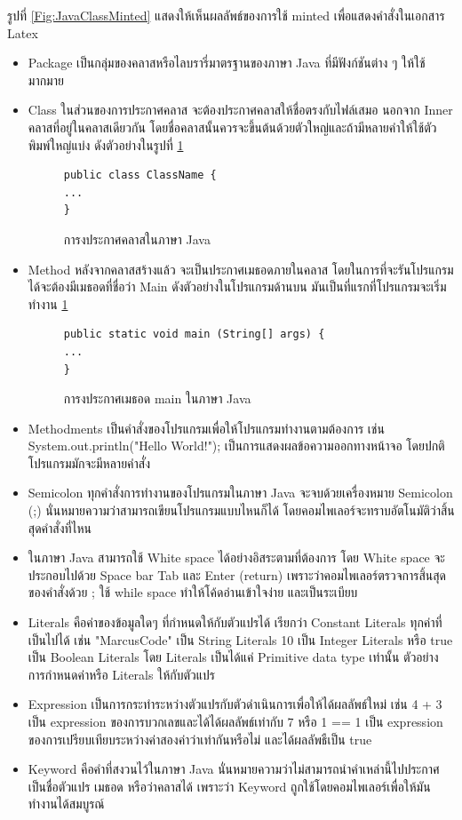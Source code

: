   รูปที่ \ref{Fig:JavaClassMinted} แสดงให้เห็นผลลัพธ์ของการใช้ minted เพื่อแสดงคำสั่งในเอกสาร Latex

	\begin{itemize}
		\item Package เป็นกลุ่มของคลาสหรือไลบรารี่มาตรฐานของภาษา Java ที่มีฟังก์ชันต่าง ๆ ให้ใช้มากมาย
		\item Class ในส่วนของการประกาศคลาส จะต้องประกาศคลาสให้ชื่อตรงกับไฟล์เสมอ นอกจาก Inner คลาสที่อยู่ในคลาสเดียวกัน โดยชื่อคลาสนั้นควรจะขึ้นต้นด้วยตัวใหญ่และถ้ามีหลายคำให้ใช้ตัวพิมพ์ใหญ่แบ่ง ดังตัวอย่างในรูปที่ \ref{Fig:ClassName}
				\begin{figure}[H]
					{\begin{lstlisting}
public class ClassName {
...
}
						\end{lstlisting}}
					\caption{การงประกาศคลาสในภาษา Java}
					\label{Fig:ClassName}
				\end{figure}
			\item Method หลังจากคลาสสร้างแล้ว จะเป็นประกาศเมธอดภายในคลาส โดยในการที่จะรันโปรแกรมได้จะต้องมีเมธอดที่ชื่อว่า Main ดังตัวอย่างในโปรแกรมด้านบน มันเป็นที่แรกที่โปรแกรมจะเริ่มทำงาน \ref{Fig:ClassName}
			\begin{figure}[H]
				{\begin{lstlisting}
public static void main (String[] args) {
...
}
					\end{lstlisting}}
				\caption{การงประกาศเมธอด main ในภาษา Java}
				\label{Fig:main}
			\end{figure}
			\item Methodments เป็นคำสั่งของโปรแกรมเพื่อให้โปรแกรมทำงานตามต้องการ เช่น System.out.println("Hello World!"); เป็นการแสดงผลข้อความออกทางหน้าจอ โดยปกติโปรแกรมมักจะมีหลายคำสั่ง
			\item Semicolon ทุกคำสั่งการทำงานของโปรแกรมในภาษา Java จะจบด้วยเครื่องหมาย Semicolon (;) นั่นหมายความว่าสามารถเขียนโปรแกรมแบบไหนก็ได้ โดยคอมไพเลอร์จะทราบอัตโนมัติว่าสิ้นสุดคำสั่งที่ไหน
			\item ในภาษา Java สามารถใช้ White space ได้อย่างอิสระตามที่ต้องการ โดย White space จะประกอบไปด้วย Space bar Tab และ Enter (return) เพราะว่าคอมไพเลอร์ตรวจการสิ้นสุดของคำสั่งด้วย ; ใช้ while space ทำให้โค้ดอ่านเข้าใจง่าย และเป็นระเบียบ
			\item Literals คือค่าของข้อมูลใดๆ ที่กำหนดให้กับตัวแปรได้ เรียกว่า Constant Literals ทุกค่าที่เป็นไปได้ เช่น "MarcusCode" เป็น String Literals 10 เป็น Integer Literals หรือ true เป็น Boolean Literals โดย Literals เป็นได้แค่ Primitive data type เท่านั้น ตัวอย่างการกำหนดค่าหรือ Literals ให้กับตัวแปร
			\item Expression เป็นการกระทำระหว่างตัวแปรกับตัวดำเนินการเพื่อให้ได้ผลลัพธ์ใหม่ เช่น 4 + 3 เป็น expression ของการบวกเลขและได้ได้ผลลัพธ์เท่ากับ 7 หรือ 1 == 1 เป็น expression ของการเปรียบเทียบระหว่างค่าสองค่าว่าเท่ากันหรือไม่ และได้ผลลัพธืเป็น true
			\item Keyword คือคำที่สงวนไว้ในภาษา Java นั่นหมายความว่าไม่สามารถนำคำเหล่านี้ไปประกาศเป็นชื่อตัวแปร เมธอด หรือว่าคลาสได้ เพราะว่า Keyword ถูกใช้โดยคอมไพเลอร์เพื่อให้มันทำงานได้สมบูรณ์
		\end{itemize}
	
